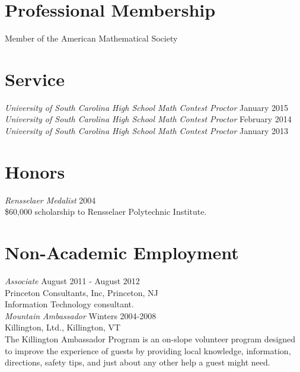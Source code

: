 \documentclass{article}
\begin{document}

\section*{Professional Membership}
Member of the American Mathematical Society

\section*{Service}
\textsl{University of South Carolina High School Math Contest Proctor} \hfill January 2015\\
\textsl{University of South Carolina High School Math Contest Proctor} \hfill February 2014\\
\textsl{University of South Carolina High School Math Contest Proctor} \hfill January 2013

\section*{Honors}
\textsl{Rensselaer Medalist} \hfill 2004\\
\$60,000 scholarship to Rensselaer Polytechnic Institute.

\section*{Non-Academic Employment}             
\textsl{Associate} \hfill August 2011 - August 2012\\
Princeton Consultants, Inc, Princeton, NJ\\
Information Technology consultant.\\

\noindent\textsl{Mountain Ambassador} \hfill Winters 2004-2008\\
Killington, Ltd., Killington, VT \\
The Killington Ambassador Program is an on-slope volunteer program
designed to improve the experience of guests by providing local knowledge, 
information, directions, safety tips, and just about any other help a guest might need.
\end{document}
